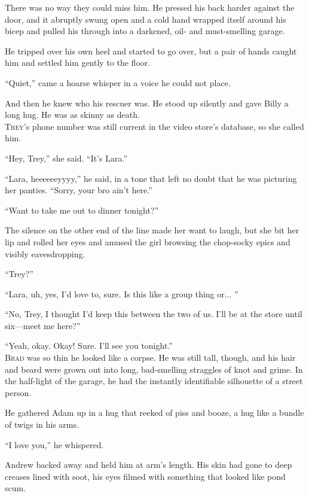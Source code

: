 \documentclass{article}
\begin{document}
There was no way they could miss him.  He pressed his back harder
against the door, and it abruptly swung open and a cold hand wrapped
itself around his bicep and pulled his through into a darkened, oil-
and must-smelling garage.

He tripped over his own heel and started to go over, but a pair of
hands caught him and settled him gently to the floor.

``Quiet,'' came a hoarse whisper in a voice he could not place.

And then he knew who his rescuer was.  He stood up silently and gave
Billy a long hug.  He was as skinny as death.
\\
\lettrine[lines=3, lhang=.5, nindent=0pt, findent=2pt]{T}{rey}'s phone number was still current in the video store's database,
so she called him.

``Hey, Trey,'' she said.  ``It's Lara.''

``Lara, heeeeeeyyyy,'' he said, in a tone that left no doubt that he
was picturing her panties.  ``Sorry, your bro ain't here.''

``Want to take me out to dinner tonight?''

The silence on the other end of the line made her want to laugh, but
she bit her lip and rolled her eyes and amused the girl browsing the
chop-socky epics and visibly eavesdropping.

``Trey?''

``Lara, uh, yes, I'd love to, sure.  Is this like a group thing or... 
''

``No, Trey, I thought I'd keep this between the two of us.  I'll be at
the store until six---meet me here?''

``Yeah, okay.  Okay!  Sure.  I'll see you tonight.''
\\
\lettrine[lines=3, lhang=.5, nindent=0pt, findent=2pt]{B}{rad} was so thin he looked like a corpse.  He was still tall, though,
and his hair and beard were grown out into long, bad-smelling
straggles of knot and grime.  In the half-light of the garage, he had
the instantly identifiable silhouette of a street person.

He gathered Adam up in a hug that reeked of piss and booze, a hug like
a bundle of twigs in his arms.

``I love you,'' he whispered.

Andrew backed away and held him at arm's length.  His skin had gone to
deep creases lined with soot, his eyes filmed with something that
looked like pond scum.
\end{document}
